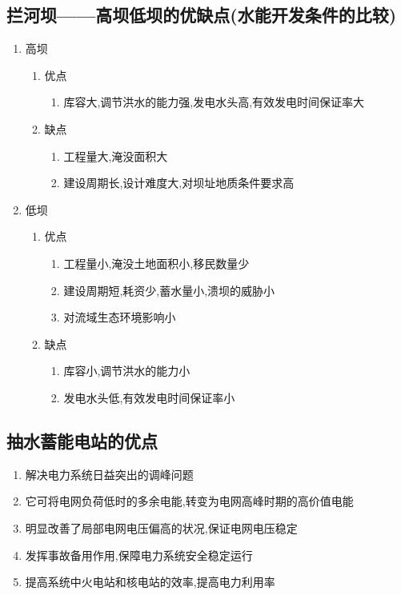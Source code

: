 \documentclass[a4paper]{article}
\begin{document}
    \subsection{拦河坝——高坝低坝的优缺点(水能开发条件的比较)}
    \begin{enumerate}
        \item 高坝
        \begin{enumerate}
            \item 优点
            \begin{enumerate}
                \item 库容大,调节洪水的能力强,发电水头高,有效发电时间保证率大
            \end{enumerate}
            \item 缺点
            \begin{enumerate}
                \item 工程量大,淹没面积大
                \item 建设周期长,设计难度大,对坝址地质条件要求高
            \end{enumerate}
        \end{enumerate}
        \item 低坝
        \begin{enumerate}
            \item 优点
            \begin{enumerate}
                \item 工程量小,淹没土地面积小,移民数量少
                \item 建设周期短,耗资少,蓄水量小,溃坝的威胁小
                \item 对流域生态环境影响小
            \end{enumerate}
            \item 缺点
            \begin{enumerate}
                \item 库容小,调节洪水的能力小
                \item 发电水头低,有效发电时间保证率小
            \end{enumerate}
        \end{enumerate}
    \end{enumerate}
    \subsection{抽水蓄能电站的优点}
    \begin{enumerate}
        \item 解决电力系统日益突出的调峰问题
        \item 它可将电网负荷低时的多余电能,转变为电网高峰时期的高价值电能
        \item 明显改善了局部电网电压偏高的状况,保证电网电压稳定
        \item 发挥事故备用作用,保障电力系统安全稳定运行
        \item 提高系统中火电站和核电站的效率,提高电力利用率
    \end{enumerate}
\end{document}
